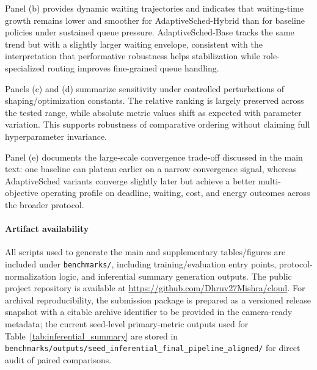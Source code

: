 \documentclass[journal]{IEEEtran}
\begin{document}
Panel (b) provides dynamic waiting trajectories and indicates that waiting-time growth remains lower and smoother for AdaptiveSched-Hybrid than for baseline policies under sustained queue pressure. AdaptiveSched-Base tracks the same trend but with a slightly larger waiting envelope, consistent with the interpretation that performative robustness helps stabilization while role-specialized routing improves fine-grained queue handling.

Panels (c) and (d) summarize sensitivity under controlled perturbations of shaping/optimization constants. The relative ranking is largely preserved across the tested range, while absolute metric values shift as expected with parameter variation. This supports robustness of comparative ordering without claiming full hyperparameter invariance.

Panel (e) documents the large-scale convergence trade-off discussed in the main text: one baseline can plateau earlier on a narrow convergence signal, whereas AdaptiveSched variants converge slightly later but achieve a better multi-objective operating profile on deadline, waiting, cost, and energy outcomes across the broader protocol.

\paragraph{Artifact availability}
All scripts used to generate the main and supplementary tables/figures are included under \texttt{benchmarks/}, including training/evaluation entry points, protocol-normalization logic, and inferential summary generation outputs. The public project repository is available at \url{https://github.com/Dhruv27Mishra/cloud}. For archival reproducibility, the submission package is prepared as a versioned release snapshot with a citable archive identifier to be provided in the camera-ready metadata; the current seed-level primary-metric outputs used for Table~\ref{tab:inferential_summary} are stored in \texttt{benchmarks/outputs/seed\_inferential\_final\_pipeline\_aligned/} for direct audit of paired comparisons.
\end{document}
